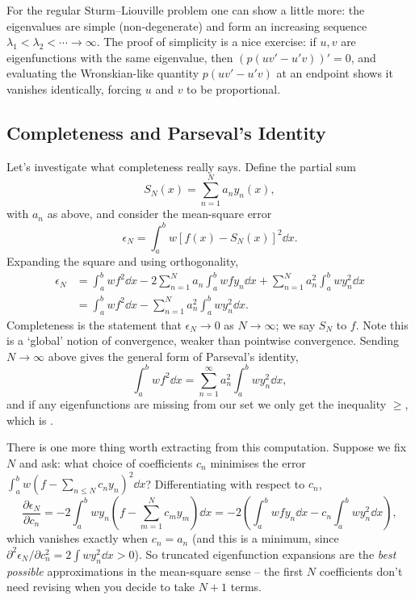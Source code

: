 \documentclass[a4paper]{scrartcl}
\begin{document}
\begin{remark}
    For the regular Sturm--Liouville problem one can show a little more: the eigenvalues are simple (non-degenerate) and form an increasing sequence $\lambda_1 < \lambda_2 < \cdots \rightarrow \infty$. The proof of simplicity is a nice exercise: if $u, v$ are eigenfunctions with the same eigenvalue, then $(p(uv' - u'v))' = 0$, and evaluating the Wronskian-like quantity $p(uv' - u'v)$ at an endpoint shows it vanishes identically, forcing $u$ and $v$ to be proportional.
\end{remark}

\subsection{Completeness and Parseval's Identity}

Let's investigate what completeness really says. Define the partial sum
$$
S_N(x) = \sum_{n = 1}^N a_n y_n(x),
$$
with $a_n$ as above, and consider the mean-square error
$$
\epsilon_N = \int_a^b w \left[f(x) - S_N(x)\right]^2 \dd x.
$$
Expanding the square and using orthogonality,
\begin{align*}
    \epsilon_N &= \int_a^b w f^2 \dd x - 2\sum_{n = 1}^N a_n \int_a^b w f y_n \dd x + \sum_{n = 1}^N a_n^2 \int_a^b w y_n^2 \dd x \\
    &= \int_a^b w f^2 \dd x - \sum_{n = 1}^N a_n^2 \int_a^b w y_n^2 \dd x.
\end{align*}
Completeness is the statement that $\epsilon_N \rightarrow 0$ as $N \rightarrow \infty$; we say $S_N$  to $f$. Note this is a `global' notion of convergence, weaker than pointwise convergence. Sending $N \to \infty$ above gives the general form of Parseval's identity,
$$
\int_a^b w f^2 \dd x = \sum_{n = 1}^{\infty} a_n^2 \int_a^b w y_n^2 \dd x,
$$
and if any eigenfunctions are missing from our set we only get the inequality $\geq$, which is .

There is one more thing worth extracting from this computation. Suppose we fix $N$ and ask: what choice of coefficients $c_n$ minimises the error $\int_a^b w (f - \sum_{n \leq N} c_n y_n)^2 \dd x$? Differentiating with respect to $c_n$,
$$
\frac{\partial \epsilon_N}{\partial c_n} = -2 \int_a^b w y_n \left(f - \sum_{m = 1}^N c_m y_m \right) \dd x = -2\left(\int_a^b w f y_n \dd x - c_n \int_a^b w y_n^2 \dd x\right),
$$
which vanishes exactly when $c_n = a_n$ (and this is a minimum, since $\partial^2 \epsilon_N / \partial c_n^2 = 2 \int w y_n^2 \dd x > 0$). So truncated eigenfunction expansions are the \emph{best possible} approximations in the mean-square sense -- the first $N$ coefficients don't need revising when you decide to take $N + 1$ terms.
\end{document}
